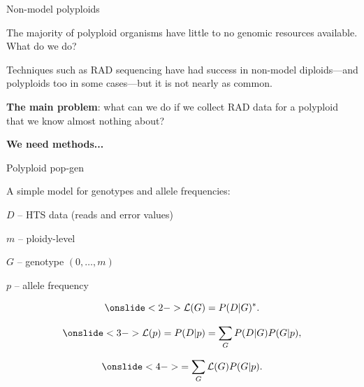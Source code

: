 \documentclass[presentation,sansserif]{beamer}
\begin{document}
\begin{frame}[t]{Non-model polyploids}
  \vspace{0.1in}

  The majority of polyploid organisms have little to no genomic resources available. \pause What do we do?
  \vspace{0.3in}
  \pause
  
  Techniques such as RAD sequencing have had success in non-model diploids---and polyploids too in some cases---but it is not nearly as common.
  \vspace{0.3in}
  \pause
  
  \textbf{The main problem}: what can we do if we collect RAD data for a polyploid that we know almost nothing about?
  \vspace{0.3in}
  \pause
  
  \textbf{We need methods...}

\end{frame}

\begin{frame}[t]{Polyploid pop-gen}

  \vspace{0.1in}
  A simple model for genotypes and allele frequencies:
  \vspace{0.2in}
  
	$D$ -- HTS data (reads and error values)
	
	$m$ -- ploidy-level
	
	$G$ -- genotype $(0,\dots,m)$
	
	$p$ -- allele frequency
		
	\pause
	\begin{equation*}
		\onslide<2->{\mathcal{L}(G) = P(D|G)^*.}
	\end{equation*}
	\vspace{-0.2in}
	
	\begin{equation*}
		\onslide<3->{\mathcal{L}(p) = P(D|p) = \sum_G P(D|G)P(G|p),}
	\end{equation*}
	\vspace{-0.2in}
	
	\begin{equation*}
		\onslide<4->{= \sum_G \mathcal{L}(G)P(G|p).}
	\end{equation*}
	

\end{frame}
\end{document}
